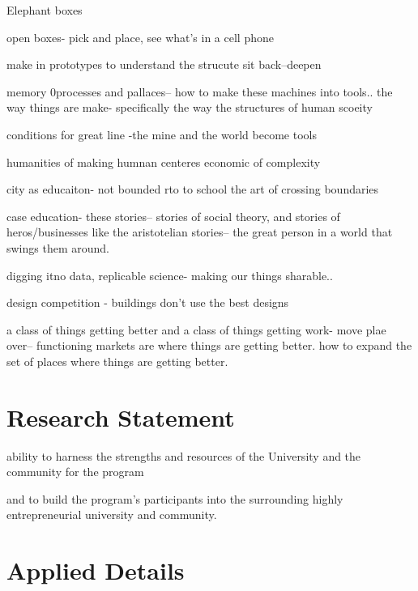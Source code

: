 Elephant boxes


open boxes- pick and place, see what's in a cell phone

make in prototypes to understand the strucute
sit back--deepen

memory 0processes and pallaces-- how to make these machines into tools.. the way things are make- specifically the way the structures of human scoeity


conditions for great line -the mine and the world become tools

humanities of making
humnan centeres economic of complexity

city as educaiton- not bounded rto to school the art of crossing boundaries


case education- these stories-- stories of social theory, and stories of heros/businesses like the aristotelian stories-- the great person in a world that swings them around.


digging itno data, replicable science- making our things sharable..

design competition - buildings don't use the best designs

a class of things getting better and a class of things getting work- move plae over-- functioning markets are where things are getting better. how to expand the set of places where things are getting better. 

\section{Research Statement}

ability to harness the strengths and resources of the University and the community for the program 

and to build the program's participants into the surrounding  highly entrepreneurial university and community.



\section{Applied Details}

